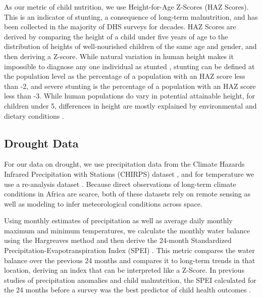 \documentclass{article}
\begin{document}
As our metric of child nutrition, we use Height-for-Age Z-Scores (HAZ Scores).  This is an indicator of stunting, a consequence of long-term malnutrition, and has been collected in the majority of DHS surveys for decades.  HAZ Scores are derived by comparing the height of a child under five years of age to the distribution of heights of well-nourished children of the same age and gender, and then deriving a Z-score.  While natural variation in human height makes it impossible to diagnose any one individual as stunted \cite{Perumal2018}, stunting can be defined at the population level as the percentage of a population with an HAZ score less than -2, and severe stunting is the percentage of a population with an HAZ score less than -3.  While human populations do vary in potential attainable height, for children under 5, differences in height are mostly explained by environmental and dietary conditions \cite{Habicht1974}.

\subsection{Drought Data}
For our data on drought, we use precipitation data from the Climate Hazards Infrared Precipitation with Stations (CHIRPS) dataset \cite{Funk2015}, and for temperature we use a re-analysis dataset \cite{Sheffield2006}.  Because direct observations of long-term climate conditions in Africa are scarce, both of these datasets rely on remote sensing as well as modeling to infer meteorological conditions across space.

Using monthly estimates of precipitation as well as average daily monthly maximum and minimum temperatures, we calculate the monthly water balance using the Hargreaves method \cite{Hargreaves1982} and then derive the 24-month Standardized Precipitation-Evapotranspiration Index (SPEI) \cite{Begueria2014}.  This metric compares the water balance over the previous 24 months and compares it to long-term trends in that location, deriving an index that can be interpreted like a Z-Score.  In previous studies of precipitation anomalies and child malnutrition, the SPEI calculated for the 24 months before a survey was the best predictor of child health outcomes \cite{Cooper2019Mapping}.
\end{document}
